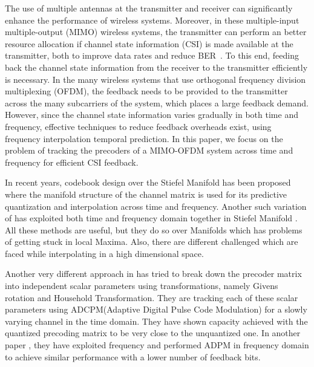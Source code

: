 \documentclass[conference]{IEEEtran}
\begin{document}
The use of multiple antennas at the transmitter and receiver can significantly enhance the performance of wireless systems. Moreover, in these multiple-input multiple-output (MIMO) wireless systems, the transmitter can perform an better resource allocation if channel state information (CSI) is made available at the transmitter, both to improve data rates and reduce BER~\cite{love2008overview}. To this end, feeding back the channel state information from the receiver to the transmitter efficiently is necessary. In the many wireless systems that use orthogonal frequency division multiplexing (OFDM), the feedback needs to be provided to the transmitter across the many subcarriers of the system, which places a large feedback demand. However, since the channel state information varies gradually in both time and frequency, effective techniques to reduce feedback overheads exist, using frequency interpolation temporal prediction. In this paper, we focus on the problem of tracking the precoders of a MIMO-OFDM system across time and frequency for efficient CSI feedback.

In recent years, codebook design over the Stiefel Manifold \cite{6891198} has been proposed where the manifold structure of the channel matrix is used for its predictive quantization and interpolation across time and frequency. Another such variation of \cite{6891198} has exploited both time and frequency domain together in Stiefel Manifold \cite{Gupt1905:Predictive}. All these methods are useful, but they do so over Manifolds which has problems of getting stuck in local Maxima. Also, there are different challenged which are faced while interpolating in a high dimensional space.

Another very different approach in \cite{4114278} has tried to break down the precoder matrix into independent scalar parameters using transformations, namely Givens rotation and Household Transformation. They are tracking each of these scalar parameters using ADCPM(Adaptive Digital Pulse Code Modulation) for a slowly varying channel in the time domain. They have shown capacity achieved with the quantized precoding matrix to be very close to the unquantized one. In another paper \cite{4556174}, they have exploited frequency and performed ADPM in frequency domain to achieve similar performance with a lower number of feedback bits.  
\end{document}
